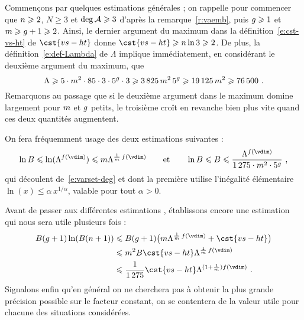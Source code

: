 Commençons par quelques estimations générales ; on rappelle pour commencer que
\( n \geqslant 2 \), \( N \ge 3 \) et \( \deg \mathcal A \geqslant 3 \) d'après la
remarque~\vref{r:vaemb}, puis \( g \geqslant 1 \) et \( m \geqslant g + 1
  \geqslant 2 \). Ainsi, le dernier argument du maximum dans la
définition~\eqref{e:cst-vs-ht} de \( \cst{vs-ht} \) donne
\( \cst{vs-ht} \ge \dimp \ln 3 \ge 2 \).
De plus, la définition~\eqref{e:def-Lambda} de \( \Lambda \) implique
immédiatement, en considérant le deuxième argument du maximum, que
\begin{equation}
  \Lambda
  \geqslant
  5 \cdot m^2 \cdot 85 \cdot 3 \cdot 5^g \cdot 3
  \geqslant
  3\,825 \, m^2 \, 5^g
  \geqslant
  19\,125 \, m^2
  \geqslant
  76\,500
  \text{ .}
\end{equation}
Remarquons au passage que si le deuxième argument dans le maximum domine
largement pour \( m \) et \( g \) petits, le troisième croît en
revanche bien plus vite quand ces deux quantités augmentent.

On fera fréquemment usage des deux estimations suivantes :
\begin{equation}
  \ln B
  \le
  \ln(\Lambda^{f(\vdim)})
  \le
  \puiss \Lambda^{\frac1\puiss\,f(\vdim)}
  \qquad\text{et}\qquad
  \ln B
  \le
  B
  \le
  \frac{ \Lambda^{f(\vdim)} }{ 1\,275 \cdot \puiss^2 \cdot 5^\genre }
  \pmm,
\end{equation}
qui découlent de~\eqref{e:varset-deg} et dont la première utilise l'inégalité
élémentaire \( \ln(x) \le \alpha \, x^{1/\alpha} \), valable pour tout
\( \alpha > 0 \).

Avant de passer aux différentes estimations , établissons encore
une estimation qui nous sera utile plusieurs fois :
\begin{align}
  B (\genre + 1) \ln (B (\dimp+1))
  & \le
  B (\genre + 1) \bigl(
    \puiss \Lambda^{\frac1\puiss\,f(\vdim)}
    + \cst{vs-ht}
  \bigr)
  \\ & \le
  \puiss^2 B \cst{vs-ht} \Lambda^{\frac1\puiss\,f(\vdim)}
  \\ & \le \label{e:adhoc-gen}
  \frac1{1\,275} \cst{vs-ht} \Lambda^{(1 + \frac1\puiss) f(\vdim)}
  \pmm.
\end{align}
Signalons enfin qu'en général on ne cherchera pas à obtenir la plus grande
précision possible sur le facteur constant, on se contentera de la valeur
utile pour chacune des situations considérées.

\medskip

